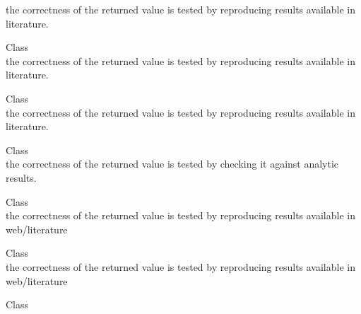 \begin{DoxyRefList}
\label{test__test000098}%
%
the correctness of the returned value is tested by reproducing results available in literature.  
\item[Class \doxylink{class_quant_lib_1_1_m_c_discrete_geometric_a_p_heston_engine}{Quant\+Lib\+::MCDiscrete\+Geometric\+APHeston\+Engine\texorpdfstring{$<$}{<} RNG, S, P \texorpdfstring{$>$}{>}} ]\hfill \\
\label{test__test000099}%
%
the correctness of the returned value is tested by reproducing results available in literature.  
\item[Class \doxylink{class_quant_lib_1_1_m_c_european_basket_engine}{Quant\+Lib\+::MCEuropean\+Basket\+Engine\texorpdfstring{$<$}{<} RNG, S \texorpdfstring{$>$}{>}} ]\hfill \\
\label{test__test000115}%
%
the correctness of the returned value is tested by reproducing results available in literature.  
\item[Class \doxylink{class_quant_lib_1_1_m_c_european_engine}{Quant\+Lib\+::MCEuropean\+Engine\texorpdfstring{$<$}{<} RNG, S \texorpdfstring{$>$}{>}} ]\hfill \\
\label{test__test000158}%
%
the correctness of the returned value is tested by checking it against analytic results.  
\item[Class \doxylink{class_quant_lib_1_1_m_c_european_g_j_r_g_a_r_c_h_engine}{Quant\+Lib\+::MCEuropean\+GJRGARCHEngine\texorpdfstring{$<$}{<} RNG, S \texorpdfstring{$>$}{>}} ]\hfill \\
\label{test__test000159}%
%
the correctness of the returned value is tested by reproducing results available in web/literature  
\item[Class \doxylink{class_quant_lib_1_1_m_c_european_heston_engine}{Quant\+Lib\+::MCEuropean\+Heston\+Engine\texorpdfstring{$<$}{<} RNG, S, P \texorpdfstring{$>$}{>}} ]\hfill \\
\label{test__test000160}%
%
the correctness of the returned value is tested by reproducing results available in web/literature  
\item[Class \doxylink{class_quant_lib_1_1_m_c_forward_european_b_s_engine}{Quant\+Lib\+::MCForward\+European\+BSEngine\texorpdfstring{$<$}{<} RNG, S \texorpdfstring{$>$}{>}} ]\hfill \\
\label{test__test000124}%
%


\end{DoxyRefList}
